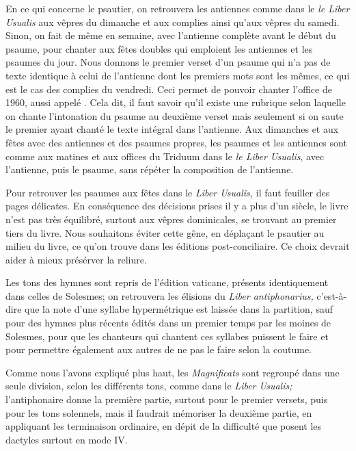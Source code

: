 \begin{frpars}
En ce qui concerne le psautier, on retrouvera les antiennes comme dans le \textit{le Liber Usualis} aux vêpres du dimanche et aux complies ainsi qu'aux vêpres du samedi. Sinon, on fait de même en semaine, avec l'antienne complète avant le début du psaume, pour chanter aux fêtes doubles qui emploient les antiennes et les psaumes du jour. Nous donnons le premier verset d'un psaume qui n'a pas de texte identique à celui de l'antienne dont les premiers mots sont les mêmes, ce qui est le cas des complies du vendredi. Ceci permet de pouvoir chanter l'office de 1960, aussi appelé . Cela dit, il faut savoir qu'il existe une rubrique selon laquelle on chante l'intonation du psaume au deuxième verset mais seulement si on saute le premier ayant chanté le texte intégral dans l'antienne. Aux dimanches et aux fêtes avec des antiennes et des psaumes propres, les psaumes et les antiennes sont comme aux matines et aux offices du Triduum dans le \textit{le Liber Usualis}, avec l'antienne, puis le psaume, sans répéter la composition de l'antienne.

Pour retrouver les psaumes aux fêtes dans le \textit{Liber Usualis,} il faut feuiller des pages délicates. En conséquence des décisions prises il y a plus d'un siècle, le livre n'est pas très équilibré, surtout aux vêpres dominicales, se trouvant au premier tiers du livre. Nous souhaitons éviter cette gêne, en déplaçant le psautier au milieu du livre, ce qu'on trouve dans les éditions post-conciliaire. Ce choix devrait aider à mieux présérver la reliure.

Les tons des hymnes sont repris de l'édition vaticane, présents identiquement dans celles de Solesmes; on retrouvera les élisions du \textit{Liber antiphonarius,} c’est-à-dire que la note d'une syllabe hypermétrique est laissée dans la partition, sauf pour des hymnes plus récents édités dans un premier temps par les moines de Solesmes, pour que les chanteurs qui chantent ces syllabes puissent le faire et pour permettre également aux autres de ne pas le faire selon la coutume. 

Comme nous l'avons expliqué plus haut, les \textit{Magnificats} sont regroupé dans une seule division, selon les différents tons, comme dans le \textit{Liber Usualis;} l'antiphonaire donne la première partie, surtout pour le premier versets, puis pour les tons solennels, mais il faudrait mémoriser la deuxième partie, en appliquant les terminaison ordinaire, en dépit de la difficulté que posent les dactyles surtout en mode IV.


\end{frpars}
